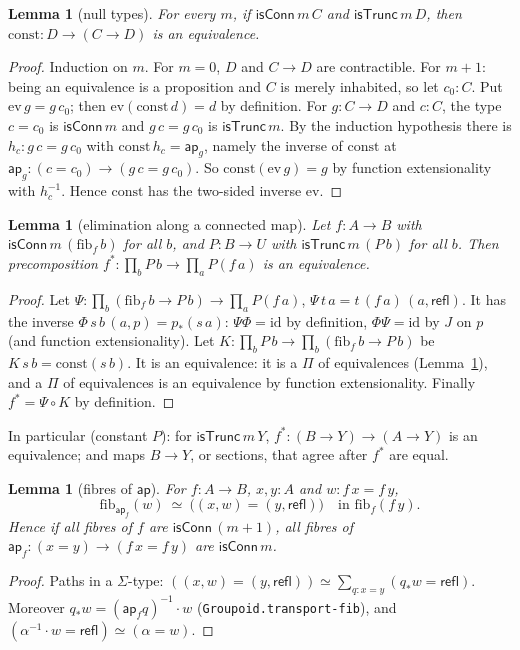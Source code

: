 \documentclass[11pt]{amsart}
\newtheorem{lemma}[theorem]{Lemma}
\theoremstyle{definition}
\theoremstyle{remark}
\newcommand{\fib}{\mathrm{fib}}
\newcommand{\code}[1]{\texttt{#1}}
\newcommand{\cT}{\mathsf{isTrunc}}
\newcommand{\cC}{\mathsf{isConn}}
\begin{document}
\begin{lemma}[null types]\label{lem:null}
For every $m$, if $\cC\,m\,C$ and $\cT\,m\,D$, then
$\mathrm{const}:D\to(C\to D)$ is an equivalence.
\end{lemma}
\begin{proof}
Induction on $m$. For $m=0$, $D$ and $C\to D$ are contractible.
For $m+1$: being an equivalence is a proposition and $C$ is merely
inhabited, so let $c_0:C$. Put $\mathrm{ev}\,g=g\,c_0$; then
$\mathrm{ev}(\mathrm{const}\,d)=d$ by definition. For $g:C\to D$ and $c:C$,
the type $c=c_0$ is $\cC\,m$ and $g\,c=g\,c_0$ is $\cT\,m$. By the
induction hypothesis there is $h_c:g\,c=g\,c_0$ with
$\mathrm{const}\,h_c=\mathsf{ap}_g$, namely the inverse of $\mathrm{const}$
at $\mathsf{ap}_g:(c=c_0)\to(g\,c=g\,c_0)$. So
$\mathrm{const}(\mathrm{ev}\,g)=g$ by function extensionality with
$h_c^{-1}$. Hence $\mathrm{const}$ has the two-sided inverse
$\mathrm{ev}$.
\end{proof}

\begin{lemma}[elimination along a connected map]\label{lem:elim}
Let $f:A\to B$ with $\cC\,m\,(\fib_f\,b)$ for all $b$, and $P:B\to U$ with
$\cT\,m\,(P\,b)$ for all $b$. Then precomposition
$f^*:\prod_bP\,b\to\prod_aP(f\,a)$ is an equivalence.
\end{lemma}
\begin{proof}
Let $\Psi:\prod_b(\fib_f\,b\to P\,b)\to\prod_aP(f\,a)$, $\Psi\,t\,a=t\,(f\,a)\,(a,\mathsf{refl})$.
It has the inverse $\Phi\,s\,b\,(a,p)=p_*(s\,a)$: $\Psi\Phi=\mathrm{id}$ by
definition, $\Phi\Psi=\mathrm{id}$ by $J$ on $p$ (and function
extensionality). Let $K:\prod_bP\,b\to\prod_b(\fib_f\,b\to P\,b)$ be
$K\,s\,b=\mathrm{const}(s\,b)$. It is an equivalence: it is a $\Pi$ of
equivalences (Lemma~\ref{lem:null}), and a $\Pi$ of equivalences is an
equivalence by function extensionality. Finally $f^*=\Psi\circ K$ by
definition.
\end{proof}

In particular (constant $P$): for $\cT\,m\,Y$, $f^*:(B\to Y)\to(A\to Y)$ is
an equivalence; and maps $B\to Y$, or sections, that agree after $f^*$
are equal.

\begin{lemma}[fibres of $\mathsf{ap}$]\label{lem:fibap}
For $f:A\to B$, $x,y:A$ and $w:f\,x=f\,y$,
\[\fib_{\mathsf{ap}_f}(w)\ \simeq\ \big((x,w)=(y,\mathsf{refl})\big)\quad\text{in }\fib_f(f\,y).\]
Hence if all fibres of $f$ are $\cC\,(m+1)$, all fibres of
$\mathsf{ap}_f:(x=y)\to(f\,x=f\,y)$ are $\cC\,m$.
\end{lemma}
\begin{proof}
Paths in a $\Sigma$-type: $((x,w)=(y,\mathsf{refl}))\simeq\sum_{q:x=y}(q_*w=\mathsf{refl})$.
Moreover $q_*w=(\mathsf{ap}_fq)^{-1}\cdot w$ (\code{Groupoid.transport-fib}),
and $(\alpha^{-1}\cdot w=\mathsf{refl})\simeq(\alpha=w)$.
\end{proof}
\end{document}
